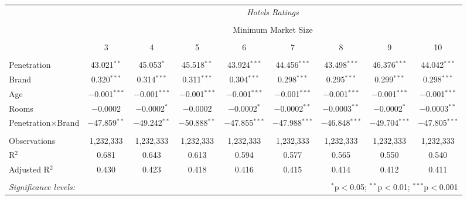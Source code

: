 \begin{table}[!htbp]
\begin{sideways}
{\begin{tabular}{@{\extracolsep{5pt}}lcccccccc}

& \multicolumn{8}{c}{\textit{Hotels Ratings}} \\ 
\cline{2-9} 
\\[-1.8ex] & \multicolumn{8}{c}{Minimum Market Size} \\ 
\\[-1.8ex] & 3 & 4 & 5 & 6 & 7 & 8 & 9 & 10\\ 
\hline \\[-1.8ex] 
 Penetration & 43.021$^{**}$ & 45.053$^{*}$ & 45.518$^{**}$ & 43.924$^{***}$ & 44.456$^{***}$ & 43.498$^{***}$ & 46.376$^{***}$ & 44.042$^{***}$ \\  
  Brand & 0.320$^{***}$ & 0.314$^{***}$ & 0.311$^{***}$ & 0.304$^{***}$ & 0.298$^{***}$ & 0.295$^{***}$ & 0.299$^{***}$ & 0.298$^{***}$ \\   
  Age & $-$0.001$^{***}$ & $-$0.001$^{***}$ & $-$0.001$^{***}$ & $-$0.001$^{***}$ & $-$0.001$^{***}$ & $-$0.001$^{***}$ & $-$0.001$^{***}$ & $-$0.001$^{***}$ \\ 
  Rooms & $-$0.0002 & $-$0.0002$^{*}$ & $-$0.0002 & $-$0.0002$^{*}$ & $-$0.0002$^{**}$ & $-$0.0003$^{**}$ & $-$0.0002$^{*}$ & $-$0.0003$^{**}$ \\  
  Penetration$\times$Brand & $-$47.859$^{**}$ & $-$49.242$^{**}$ & $-$50.888$^{**}$ & $-$47.855$^{***}$ & $-$47.988$^{***}$ & $-$46.848$^{***}$ & $-$49.704$^{***}$ & $-$47.805$^{***}$ \\
 \hline \\[-1.8ex] 
Observations & 1,232,333 & 1,232,333 & 1,232,333 & 1,232,333 & 1,232,333 & 1,232,333 & 1,232,333 & 1,232,333 \\ 
R$^{2}$ & 0.681 & 0.643 & 0.613 & 0.594 & 0.577 & 0.565 & 0.550 & 0.540 \\ 
Adjusted R$^{2}$ & 0.430 & 0.423 & 0.418 & 0.416 & 0.415 & 0.414 & 0.412 & 0.411 \\ 
\hline 
\hline \\[-1.8ex] 

\textit{Significance levels:}  & \multicolumn{8}{r}{$^{*}$p$<$0.05; $^{**}$p$<$0.01; $^{***}$p$<$0.001} \\  


\end{tabular} 
} \end{sideways}
\end{table} 
